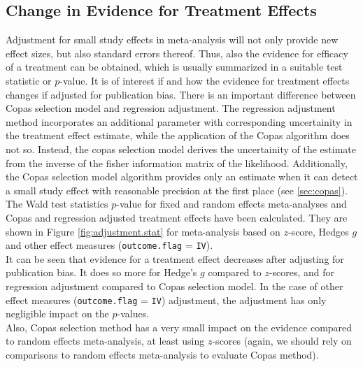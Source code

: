 \documentclass[11pt,a4paper,twoside]{book}\usepackage[]{graphicx}\usepackage[]{color}
\begin{document}
\subsection{Change in Evidence for Treatment Effects} \label{sec:change.evidence}
Adjustment for small study effects in meta-analysis will not only provide new effect sizes, but also standard errors thereof. Thus, also the evidence for efficacy of a treatment can be obtained, which is usually summarized in a suitable test statistic or $p$-value. It is of interest if and how the evidence for treatment effects changes if adjusted for publication bias. There is an important difference between Copas selection model and regression adjustment. The regression adjustment method incorporates an additional parameter with corresponding uncertainity in the treatment effect estimate, while the application of the Copas algorithm does not so. Instead, the copas selection model derives the uncertainity of the estimate from the inverse of the fisher information matrix of the likelihood. Additionally, the Copas selection model algorithm provides only an estimate when it can detect a small study effect with reasonable precision at the first place (see \ref{sec:copas}).\\
The Wald test statistics $p$-value for fixed and random effects meta-analyses and Copas and regression adjusted treatment effects have been calculated. They are shown in Figure \ref{fig:adjustment.stat} for meta-analysis based on $z$-score, Hedges $g$ and other effect measures (\texttt{outcome.flag} = \texttt{IV}). \\
It can be seen that evidence for a treatment effect decreases after adjusting for publication bias. It does so more for Hedge's $g$ compared to $z$-scores, and for regression adjustment compared to Copas selection model. 
In the case of other effect measures (\texttt{outcome.flag} = \texttt{IV}) adjustment, the adjustment has only negligible impact on the $p$-values. \\
Also, Copas selection method has a very small impact on the evidence compared to random effects meta-analysis, at least using $z$-scores (again, we should rely on comparisons to random effects meta-analysis to evaluate Copas method). \\ 
\end{document}

